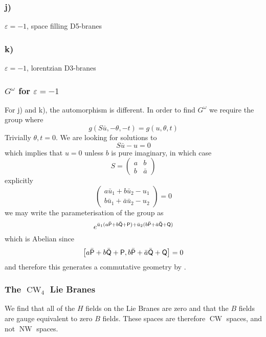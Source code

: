 \documentclass[11pt, a4paper]{article}
\def\P{{\sf P}} \def\K{{\sf K}} \def\J{{\sf J}} \def\T{{\sf FIXME}} \def\Q{{\sf Q}}
\DeclareMathOperator{\NW}{NW}
\DeclareMathOperator{\CW}{CW}
\newcommand{\1}{\mathbb{1}}
\newcommand{\cb}[2]{\left[#1,#2\right]}
\begin{document}
\subsubsection{j)}
$\varepsilon=-1$, space filling D5-branes

\subsubsection{k)}
$\varepsilon=-1$, lorentzian D3-branes

\subsubsection{$G^\omega$ for $\varepsilon=-1$}
For j) and k), the automorphism is different. In order to find $G^\omega$ we
require the group where
\begin{equation}
  \label{eq:Gomega:3}
  g(S\bar u,-\theta,-t)=g(u,\theta,t)
\end{equation}
Trivially $\theta, t=0$. We are looking for solutions to
\begin{equation}
  \label{eq:ep-1:1}
  S\bar u-u=0
\end{equation}
which implies that $u=0$ unless $b$ is pure imaginary, in which case
\begin{equation}
  \label{eq:ep-1:S}
  S=\begin{pmatrix}
    a & b \\
    b & \bar a
  \end{pmatrix}
\end{equation}
explicitly
\begin{equation}
  \label{eq:ep-1:explic}
  \begin{pmatrix}
    a\bar u_1+b\bar u_2-u_1 \\
    b\bar u_1+\bar a\bar u_2-u_2
  \end{pmatrix} = 0
\end{equation}
we may write the parameterisation of the group as
\begin{equation}
  \label{eq:ep-1:param}
  e^{\bar u_1(a\bar\P+b\bar\Q+\P)+\bar u_2(b\bar\P+\bar a\bar\Q+\Q)}
\end{equation}
which is Abelian since
\begin{equation}
  \label{eq:ep-1:abel}
  \cb{a\bar\P+b\bar\Q+\P}{b\bar\P+\bar a\bar\Q+\Q}=0
\end{equation}
and therefore this generates a commutative geometry by \cite{Alekseev:2002rj}.

\subsubsection{The $\CW_4$ Lie Branes}
We find that all of the $H$ fields on the Lie Branes are zero and that the $B$
fields are gauge equivalent to zero $B$ fields. These spaces are therefore $\CW$
spaces, and not $\NW$ spaces.
\end{document}
